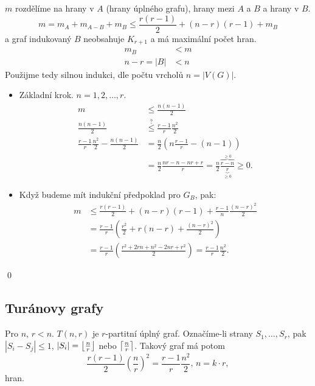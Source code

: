 $m$ rozdělíme na \colorbox{blue!30}{hrany v $A$ (hrany úplného grafu)}, \colorbox{black!30}{hrany mezi $A$ a $B$} a 
\colorbox{black!20!yellow}{hrany v $B$}. %
\begin{equation}
    m = m_A + m_{A-B} + m_B \leq \frac{r(r-1)}{2} + (n-r)(r-1) + m_B
\end{equation}
a graf indukovaný $B$ neobsahuje $K_{r+1}$ a má maximální počet hran.
\begin{align*}
    m_B &< m \\
    n-r = |B| &< n
\end{align*}
Použijme tedy silnou indukci, dle počtu vrcholů $n = |V(G)|$.
\begin{itemize}
    \item Základní krok. $n=1, 2,  \dots, r$. 
        \begin{align*}
            m &\leq \frac{n(n-1)}{2} \\
            \frac{n(n-1)}{2}&\overset{?}{\leq}\frac{r-1}{r}\frac{n^2}{2} \\
            \frac{r-1}{r}\frac{n^2}{2} - \frac{n(n-1)}{2} &= \frac{n}{2}\left(n \frac{r-1}{r}-(n-1)\right) \\
            &= \frac{n}{2}\frac{nr -n -nr +r}{r} = \frac{n}{2}\frac{\overbrace{r-n}^{\geq 0}}{\underbrace{r}_{\geq 0}}
            \geq 0.
        \end{align*}
    \item Když budeme mít indukční předpoklad pro $G_B$, pak:
        \begin{align}
            m &\leq \frac{r(r-1)}{2} + (n-r)(r-1) + \frac{r-1}{n}\frac{(n-r)^2}{2} \\
            &= \frac{r-1}{r}\left(\frac{r^2}{2} + r(n-r) + \frac{(n-r)^2}{2}\right) \\
            &= \frac{r-1}{r}\left(\frac{r^2 + 2rn + n^2 -2nr + r^2}{2}\right) = \frac{r-1}{r} \frac{n^2}{2}.
        \end{align}
\end{itemize}
\hspace{\fill}\qed

\subsection{Turánovy grafy}\label{turan}
Pro $n$, $r < n$. $T(n,r)$ je $r$-partitní úplný graf. Označíme-li strany $S_1, \dots, S_r$, pak $|S_i - S_j| \leq 1$,
$|S_i| = \floor*{\frac{n}{r}}$ nebo $\ceil*{\frac{n}{r}}$. Takový graf má potom
\[
    \frac{r(r-1)}{2}\left(\frac{n}{r}\right)^2 = \frac{r-1}{r}\frac{n^2}{2}, \, n=k \cdot r,
\]
hran.

